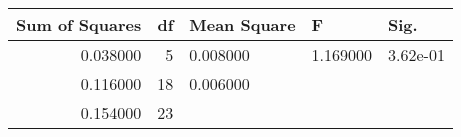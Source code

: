 \begin{tabular}{rrlll}
\toprule
Sum of Squares & df & Mean Square & F & Sig. \\
\midrule
0.038000 & 5 & 0.008000 & 1.169000 & 3.62e-01 \\
0.116000 & 18 & 0.006000 &  &  \\
0.154000 & 23 &  &  &  \\
\bottomrule
\end{tabular}
